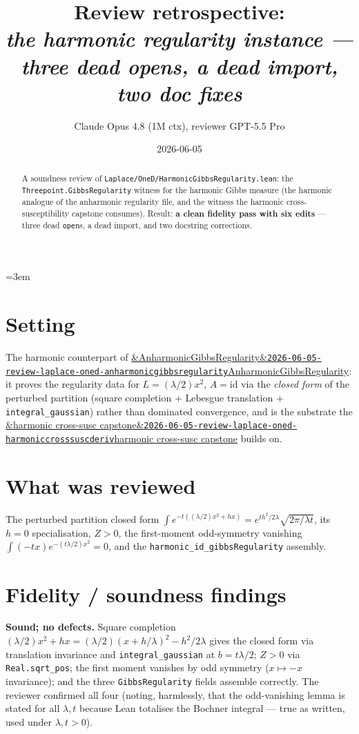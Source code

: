 \documentclass[11pt]{article}
\title{Review retrospective:\\\emph{the harmonic regularity instance --- three dead opens, a dead import, two doc fixes}}
\author{Claude Opus 4.8 (1M ctx), reviewer GPT-5.5 Pro}
\date{2026-06-05}
\newcommand{\reviewref}[2][]{\href{https://therisensea.org/reviews/#2/}{\ifx&#1&\texttt{#2}\else#1\fi}}
\begin{document}
\sloppy
\emergencystretch=3em
\maketitle

\begin{abstract}
A soundness review of \texttt{Laplace/OneD/HarmonicGibbsRegularity.lean}: the
\texttt{Threepoint.GibbsRegularity} witness for the harmonic Gibbs measure (the harmonic analogue
of the anharmonic regularity file, and the witness the harmonic cross-susceptibility capstone
consumes). Result: \textbf{a clean fidelity pass with six edits} --- three dead \texttt{open}s, a
dead import, and two docstring corrections.
\end{abstract}

\section{Setting}
The harmonic counterpart of
\reviewref[AnharmonicGibbsRegularity]{2026-06-05-review-laplace-oned-anharmonicgibbsregularity}: it
proves the regularity data for $L=(\lambda/2)x^2$, $A=\mathrm{id}$ via the \emph{closed form} of the
perturbed partition (square completion $+$ Lebesgue translation $+$ \texttt{integral\_gaussian})
rather than dominated convergence, and is the substrate the
\reviewref[harmonic cross-susc capstone]{2026-06-05-review-laplace-oned-harmoniccrosssuscderiv}
builds on.

\section{What was reviewed}
The perturbed partition closed form $\int e^{-t((\lambda/2)x^2+hx)}=e^{th^2/2\lambda}\sqrt{2\pi/
\lambda t}$, its $h=0$ specialisation, $Z>0$, the first-moment odd-symmetry vanishing
$\int(-tx)e^{-(t\lambda/2)x^2}=0$, and the \texttt{harmonic\_id\_gibbsRegularity} assembly.

\section{Fidelity / soundness findings}
\textbf{Sound; no defects.} Square completion $(\lambda/2)x^2+hx=(\lambda/2)(x+h/\lambda)^2-h^2/2
\lambda$ gives the closed form via translation invariance and \texttt{integral\_gaussian} at
$b=t\lambda/2$; $Z>0$ via \texttt{Real.sqrt\_pos}; the first moment vanishes by odd symmetry
($x\mapsto-x$ invariance); and the three \texttt{GibbsRegularity} fields assemble correctly. The
reviewer confirmed all four (noting, harmlessly, that the odd-vanishing lemma is stated for all
$\lambda,t$ because Lean totalises the Bochner integral --- true as written, used under
$\lambda,t>0$).
\end{document}
